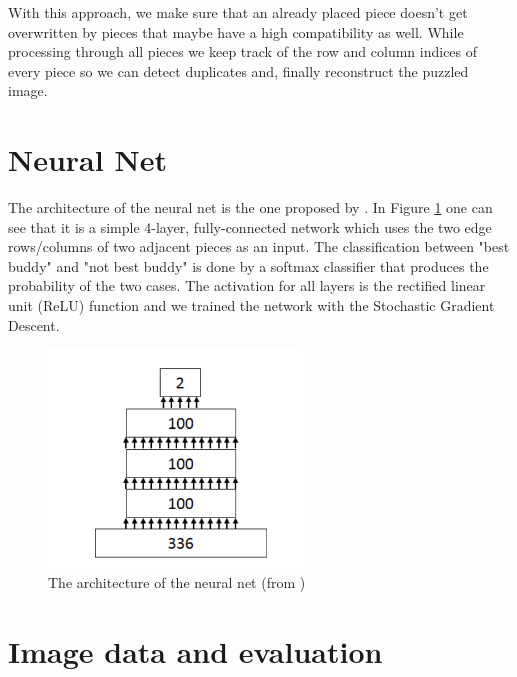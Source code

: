 \documentclass[11pt]{report}
\begin{document}
With this approach, we make sure that an already placed piece doesn't get overwritten by pieces that maybe have a high compatibility as well. While processing through all pieces we keep track of the row and column indices of every piece so we can detect duplicates and, finally reconstruct the puzzled image.
\newpage

\section{Neural Net}
The architecture of the neural net is the one proposed by \cite{sholomon2016dnn}. In Figure \ref{fig:NN} one can see that it is a simple 4-layer, fully-connected network which uses the two edge rows/columns of two adjacent pieces as an input. The classification between "best buddy" and "not best buddy" is done by a softmax classifier that produces the probability of the two cases. The activation for all layers is the rectified linear unit (ReLU) function and we trained the network with the Stochastic Gradient Descent.
\begin{figure}[ht]
	\centering
	\includegraphics[width=0.6\textwidth]{NeuralNet.PNG}
	
	\caption{The architecture of the neural net (from \cite{sholomon2016dnn})}
	\label{fig:NN}
\end{figure}


\section{Image data and evaluation}
\end{document}
